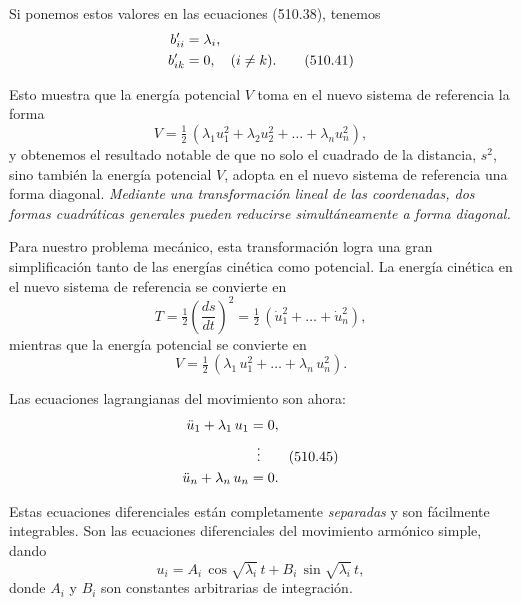 \documentclass[12pt,a4paper]{book}
\begin{document}
Si ponemos estos valores en las ecuaciones (510.38), tenemos
\begin{align}
b'_{ii} &= \lambda_i, \notag \\
b'_{ik} &= 0, \quad (i \neq k). \tag{510.41}
\end{align}

Esto muestra que la energía potencial $V$ toma en el nuevo sistema de referencia la forma
\begin{equation}
V = \tfrac{1}{2}\,(\lambda_1 u_1^2 + \lambda_2 u_2^2 + \ldots + \lambda_n u_n^2), \tag{510.42}
\end{equation}
y obtenemos el resultado notable de que no solo el cuadrado de la distancia, $s^2$, sino también la energía potencial $V$, adopta en el nuevo sistema de referencia una forma diagonal. \textit{Mediante una transformación lineal de las coordenadas, dos formas cuadráticas generales pueden reducirse simultáneamente a forma diagonal.}

Para nuestro problema mecánico, esta transformación logra una gran simplificación tanto de las energías cinética como potencial. La energía cinética en el nuevo sistema de referencia se convierte en
\begin{equation}
T = \tfrac{1}{2}\left(\frac{ds}{dt}\right)^2 = \tfrac{1}{2}\,(\dot{u}_1^2 + \ldots + \dot{u}_n^2), \tag{510.43}
\end{equation}
mientras que la energía potencial se convierte en
\begin{equation}
V = \tfrac{1}{2}\,(\lambda_1\,u_1^2 + \ldots + \lambda_n\,u_n^2). \tag{510.44}
\end{equation}


Las ecuaciones lagrangianas del movimiento son ahora:
\begin{align}
\ddot{u}_1 + \lambda_1\,u_1 &= 0, \notag \\
&\;\;\vdots \tag{510.45} \\
\ddot{u}_n + \lambda_n\,u_n &= 0. \notag
\end{align}

Estas ecuaciones diferenciales están completamente \textit{separadas} y son fácilmente integrables. Son las ecuaciones diferenciales del movimiento armónico simple, dando
\begin{equation}
u_i = A_i\,\cos\sqrt{\lambda_i}\,t + B_i\,\sin\sqrt{\lambda_i}\,t, \tag{510.46}
\end{equation}
donde $A_i$ y $B_i$ son constantes arbitrarias de integración.
\end{document}
